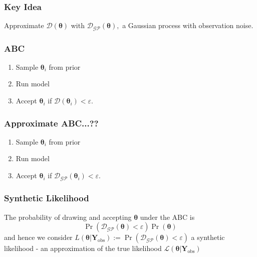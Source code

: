 \documentclass{beamer}
\begin{document}
\begin{frame}
    \frametitle{Key Idea}

    Approximate $\mathcal{D}(\bm{\theta})$ with
    $\mathcal{D}_\mathcal{GP}(\bm{\theta}),$ a Gaussian process with
    observation noise.

\end{frame}

\begin{frame}
    \frametitle{ABC}
    \begin{enumerate}
        \item Sample $\bm{\theta}_i$ from prior
        \item Run model
        \item Accept $\bm{\theta}_i$ if
              $\mathcal{D}(\bm{\theta}_i) < \varepsilon.$
    \end{enumerate}
\end{frame}

\begin{frame}
    \frametitle{Approximate ABC...??}
    \begin{enumerate}
        \item Sample $\bm{\theta}_i$ from prior
        \item Run model
        \item Accept $\bm{\theta}_i$ if
              \underline{
                  $\mathcal{D}_\mathcal{GP}(\bm{\theta}_i) < \varepsilon.$
              }
    \end{enumerate}
\end{frame}

\begin{frame}
    \frametitle{Synthetic Likelihood}

    The probability of drawing and accepting $\bm{\theta}$ under the ABC is
    $$
        \Pr(\mathcal{D}_{\mathcal{GP}}(\bm{\theta}) < \varepsilon)
        \Pr(\bm{\theta})
    $$
    and hence we consider $L(\bm\theta | \mathbf{Y}_\text{obs})
        := \Pr(\mathcal{D}_{\mathcal{GP}}(\bm{\theta}) < \varepsilon)$ a synthetic
    likelihood - an approximation of the true likelihood
    $\mathcal{L}(\bm\theta | \mathbf{Y}_\text{obs})$
\end{frame}
\end{document}
